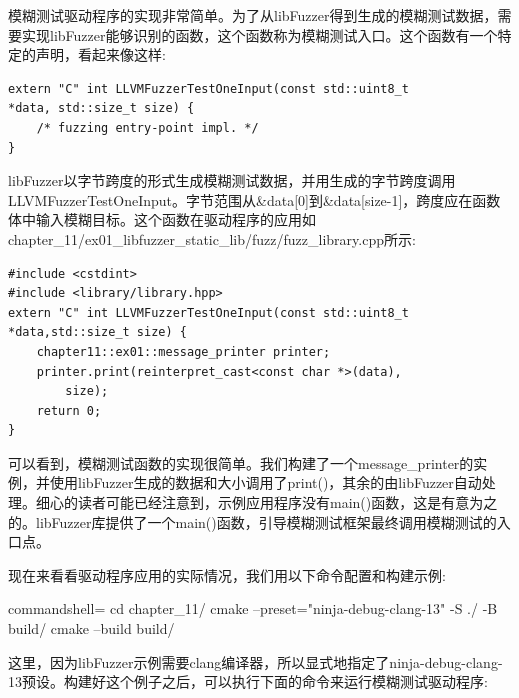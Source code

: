 模糊测试驱动程序的实现非常简单。为了从libFuzzer得到生成的模糊测试数据，需要实现libFuzzer能够识别的函数，这个函数称为模糊测试入口。这个函数有一个特定的声明，看起来像这样:

\begin{lstlisting}[style=styleCXX]
extern "C" int LLVMFuzzerTestOneInput(const std::uint8_t
*data, std::size_t size) {
	/* fuzzing entry-point impl. */
}
\end{lstlisting}

libFuzzer以字节跨度的形式生成模糊测试数据，并用生成的字节跨度调用LLVMFuzzerTestOneInput。字节范围从\&data[0]到\&data[size-1]，跨度应在函数体中输入模糊目标。这个函数在驱动程序的应用如chapter\_11/ex01\_libfuzzer\_static\_lib/fuzz/fuzz\_library.cpp所示:

\begin{lstlisting}[style=styleCXX]
#include <cstdint>
#include <library/library.hpp>
extern "C" int LLVMFuzzerTestOneInput(const std::uint8_t
*data,std::size_t size) {
	chapter11::ex01::message_printer printer;
	printer.print(reinterpret_cast<const char *>(data),
		size);
	return 0;
}
\end{lstlisting}

可以看到，模糊测试函数的实现很简单。我们构建了一个message\_printer的实例，并使用libFuzzer生成的数据和大小调用了print()，其余的由libFuzzer自动处理。细心的读者可能已经注意到，示例应用程序没有main()函数，这是有意为之的。libFuzzer库提供了一个main()函数，引导模糊测试框架最终调用模糊测试的入口点。

现在来看看驱动程序应用的实际情况，我们用以下命令配置和构建示例:

\begin{tcblisting}{commandshell={}}
cd chapter_11/
cmake --preset="ninja-debug-clang-13" -S ./ -B build/
cmake --build build/
\end{tcblisting}

这里，因为libFuzzer示例需要clang编译器，所以显式地指定了ninja-debug-clang-13预设。构建好这个例子之后，可以执行下面的命令来运行模糊测试驱动程序:

